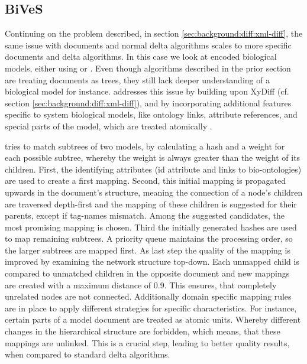 	\subsection{BiVeS}
	\label{sec:background:diff:bives}
	Continuing on the problem described, in section \ref{sec:background:diff:xml-diff}, the same issue with \xml documents and normal delta algorithms scales to more specific documents and \xml delta algorithms. In this case we look at \xml encoded biological models, either using \cellml or \sbml. Even though algorithms described in the prior section are treating \xml documents as trees, they still lack deeper understanding of a biological model for instance. \bives addresses this issue by building upon XyDiff (cf. section \ref{sec:background:diff:xml-diff}), and by incorporating additional features specific to system biological models, like ontology links, attribute references, and special parts of the model, which are treated atomically \citep{Scharm2015}.
	
	\bives tries to match subtrees of two models, by calculating a hash and a weight for each possible subtree, whereby the weight is always greater than the weight of its children.
	First, the identifying attributes (\xml id attribute and links to bio-ontologies) are used to create a first mapping. Second, this initial mapping is propagated upwards in the document's structure, meaning the connection of a node's children are traversed depth-first and the mapping of these children is suggested for their parents, except if tag-names mismatch. Among the suggested candidates, the most promising mapping is chosen.
	Third the initially generated hashes are used to map remaining subtrees. A priority queue maintains the processing order, so the larger subtrees are mapped first.
	As last step the quality of the mapping is improved by examining the network structure top-down. Each unmapped child is compared to unmatched children in the opposite document and new mappings are created with a maximum distance of $0.9$. This ensures, that completely unrelated nodes are not connected.
	Additionally domain specific mapping rules are in place to apply different strategies for specific characteristics. For instance, certain parts of a model document are treated as atomic units. Whereby different changes in the hierarchical structure are forbidden, which means, that these mappings are unlinked. This is a crucial step, leading to better quality results, when compared to standard \xml delta algorithms.
	
